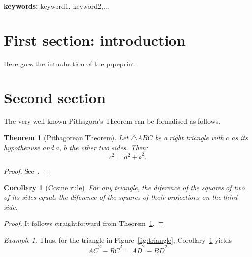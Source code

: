 \documentclass[10pt,twoside]{article}
\newtheorem{thm}{Theorem}
\newtheorem{cor}{Corollary}
\theoremstyle{remark}
\newtheorem{example}{Example}
\theoremstyle{definition}
\begin{document}
\textbf{keywords:} keyword1, keyword2,...

\tableofcontents

\section{First section: introduction}\label{sec:1stSection}
\noindent Here goes the introduction of the prpeprint

\section{Second section}\label{sec:2ndSection}
\noindent 
The very well known Pithagora's Theorem can be formalised as follows.


\begin{thm}[Pithagorean Theorem]\label{teor:Pithagoras}
	Let $\bigtriangleup\!ABC$ be a right triangle with $c$ as its
	hypothenuse and $a$, $b$ the other two sides. Then: 
	\begin{displaymath}
		c^{2} = a^{2} + b^{2}.
	\end{displaymath}	
\end{thm}

\begin{proof}
	See~\cite{Loomis_ElisaS68}.
\end{proof}

\begin{cor}[Cosine rule]\label{cor:cosRule}
	For any triangle, the diference of the squares of two of its sides
	equals the diference of the squares of their projections on the third
	side.
\end{cor}

\begin{proof}
	It follows straightforward from Theorem~\ref{teor:Pithagoras}. 
\end{proof}

\begin{example}
Thus, for the triangle in Figure~\ref{fig:triangle}, Corollary~\ref{cor:cosRule} yields
\begin{equation}
	\overline{AC}^{2} - \overline{BC}^{2} = \overline{AD}^{2} - \overline{BD}^{2}
\end{equation}
\end{example}
\end{document}
